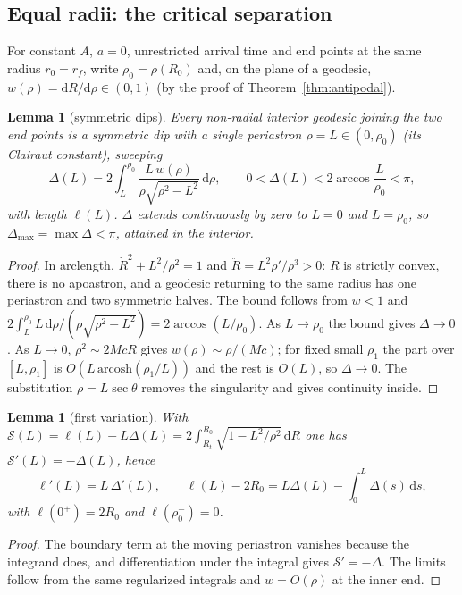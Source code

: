 \documentclass[aip,jmp,amsmath,amssymb,reprint]{revtex4-2}
\newcommand{\dd}{\mathrm{d}}
\theoremstyle{plain}
\newtheorem{lemma}[proposition]{Lemma}
\theoremstyle{definition}
\begin{document}
\subsection{Equal radii: the critical separation}
For constant $A$, $a=0$, unrestricted arrival time and end points at the same radius
$r_0=r_f$, write $\rho_0=\rho(R_0)$ and, on the plane of a geodesic, $w(\rho)=\dd R/\dd\rho\in(0,1)$
(by the proof of Theorem~\ref{thm:antipodal}).

\begin{lemma}[symmetric dips]\label{lem:dips}
Every non-radial interior geodesic joining the two end points is a symmetric dip with a
single periastron $\rho=L\in(0,\rho_0)$ (its Clairaut constant), sweeping
\[
  \Delta(L)=2\int_L^{\rho_0}\frac{L\,w(\rho)}{\rho\sqrt{\rho^2-L^2}}\,\dd\rho,\qquad
  0<\Delta(L)<2\arccos\frac L{\rho_0}<\pi ,
\]
with length $\ell(L)$. $\Delta$ extends continuously by zero to $L=0$ and $L=\rho_0$, so
$\Delta_{\max}=\max\Delta<\pi$, attained in the interior.
\end{lemma}

\begin{proof}
In arclength, $\dot R^2+L^2/\rho^2=1$ and $\ddot R=L^2\rho'/\rho^3>0$: $R$ is strictly convex,
there is no apoastron, and a geodesic returning to the same radius has one periastron and two
symmetric halves. The bound follows from $w<1$ and
$2\int_L^{\rho_0}L\,\dd\rho/(\rho\sqrt{\rho^2-L^2})=2\arccos(L/\rho_0)$. As $L\to\rho_0$ the bound gives
$\Delta\to0$. As $L\to0$, $\rho^2\sim2McR$ gives $w(\rho)\sim\rho/(Mc)$; for fixed small $\rho_1$ the
part over $[L,\rho_1]$ is $O(L\,\mathrm{arcosh}(\rho_1/L))$ and the rest is $O(L)$, so $\Delta\to0$.
The substitution $\rho=L\sec\theta$ removes the singularity and gives continuity inside.
\end{proof}

\begin{lemma}[first variation]\label{lem:first-variation}
With $\mathcal S(L)=\ell(L)-L\Delta(L)=2\int_{R_t}^{R_0}\sqrt{1-L^2/\rho^2}\,\dd R$ one has
$\mathcal S'(L)=-\Delta(L)$, hence
\[
  \ell'(L)=L\,\Delta'(L),\qquad \ell(L)-2R_0=L\Delta(L)-\int_0^L\Delta(s)\,\dd s,
\]
with $\ell(0^+)=2R_0$ and $\ell(\rho_0^-)=0$.
\end{lemma}

\begin{proof}
The boundary term at the moving periastron vanishes because the integrand does, and
differentiation under the integral gives $\mathcal S'=-\Delta$. The limits follow from the same
regularized integrals and $w=O(\rho)$ at the inner end.
\end{proof}
\end{document}
